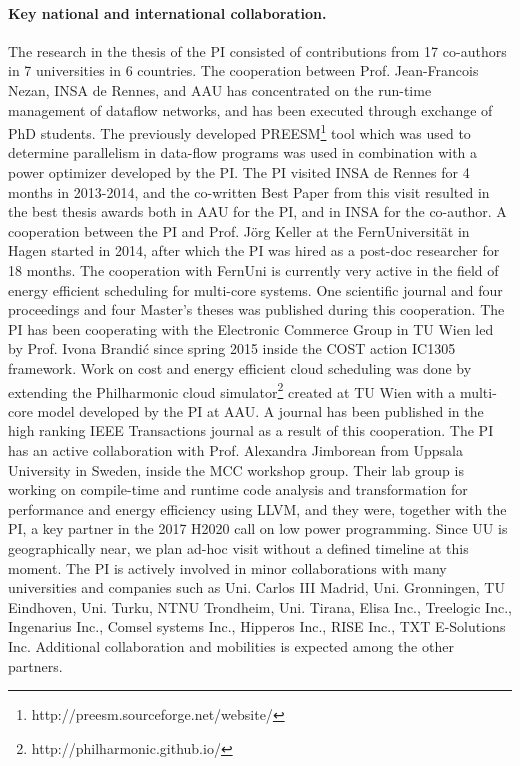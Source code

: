 \documentclass{article}
\begin{document}
\paragraph{Key national and international collaboration.}
The research in the thesis of the PI consisted of contributions from 17 co-authors in 7 universities in 6 countries.
The cooperation between Prof. Jean-Francois Nezan, INSA de Rennes, and AAU has concentrated on the run-time management of dataflow networks, 
and has been executed through exchange of PhD students.
The previously developed PREESM\footnote{http://preesm.sourceforge.net/website/} tool which was used to determine parallelism in data-flow programs was used in combination with a power optimizer developed by the PI. 
The PI visited INSA de Rennes for 4 months in 2013-2014, and the co-written Best Paper from this visit resulted in the best thesis awards both in AAU for the PI, and in INSA for the co-author.
A cooperation between the PI and Prof. J\"{o}rg Keller at the FernUniversit\"{a}t in Hagen started in 2014, after which the PI was hired as a post-doc researcher for 18 months.
The cooperation with FernUni is currently very active in the field of energy efficient scheduling for multi-core systems. 
One scientific journal and four proceedings and four Master's theses was published during this cooperation.
The PI has been cooperating with the Electronic Commerce Group in TU Wien led by Prof. Ivona Brandi\'{c} since spring 2015 inside the COST action IC1305 framework. 
Work on cost and energy efficient cloud scheduling was done by extending the Philharmonic cloud simulator\footnote{http://philharmonic.github.io/} created at TU Wien with a multi-core model developed by the PI at AAU. 
A journal has been published in the high ranking IEEE Transactions journal as a result of this cooperation.
The PI has an active collaboration with Prof. Alexandra Jimborean from Uppsala University in Sweden, inside the MCC workshop group.
Their lab group is working on compile-time and runtime code analysis and transformation for performance and energy efficiency using LLVM, and they were, together with the PI, a key partner in the 2017 H2020 call on low power programming.
Since UU is geographically near, we plan ad-hoc visit without a defined timeline at this moment.
The PI is actively involved in minor collaborations with many universities and companies such as Uni. Carlos III Madrid, Uni. Gronningen, TU Eindhoven, Uni. Turku, NTNU Trondheim, Uni. Tirana, Elisa Inc., Treelogic Inc., Ingenarius Inc., Comsel systems Inc., Hipperos Inc., RISE Inc., TXT E-Solutions Inc.
Additional collaboration and mobilities is expected among the other partners.
\end{document}
